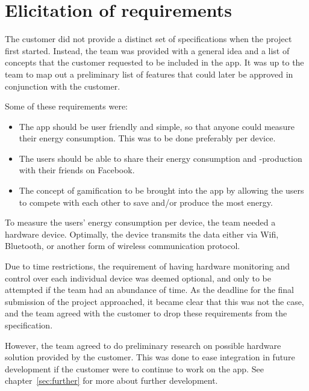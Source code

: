 \section{Elicitation of requirements}
\label{sec:obtainingreq}

The customer did not provide a distinct set of specifications when the project first started. Instead, the team was provided with a general idea and a list of concepts that the customer requested to be included in the app. It was up to the team to map out a preliminary list of features that could later be approved in conjunction with the customer. 

Some of these requirements were:
\begin{itemize}
\item The app should be user friendly and simple, so that anyone could measure their energy consumption. This was to be done preferably per device. 
\item The users should be able to share their energy consumption and -production with their friends on \gls{Facebook}. 
\item The concept of \gls{gamification} to be brought into the app by allowing the users to compete with each other to save and/or produce the most energy. 
\end{itemize}

\noindent To measure the users' energy consumption per device, the team needed a hardware device. Optimally, the device transmits the data either via Wifi, Bluetooth, or another form of wireless communication protocol.

Due to time restrictions, the requirement of having hardware monitoring and control over each individual device was deemed optional, and only to be attempted if the team had an abundance of time. As the deadline for the final submission of the project approached, it became clear that this was not the case, and the team agreed with the customer to drop these requirements from the specification. 

However, the team agreed to do preliminary research on possible hardware solution provided by the customer. This was done to ease integration in future development if the customer were to continue to work on the app. See chapter~\ref{sec:further} for more about further development.
 
